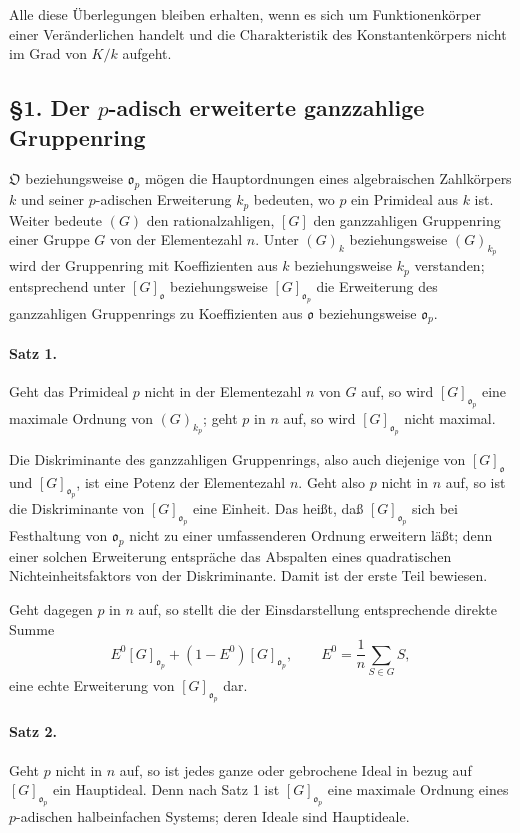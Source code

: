 \documentclass[11pt]{article}
\providecommand{\frako}{\mathfrak o}
\providecommand{\frakO}{\mathfrak O}
\begin{document}
Alle diese Überlegungen bleiben erhalten, wenn es sich um Funktionenkörper einer Veränderlichen handelt und die Charakteristik des Konstantenkörpers nicht im Grad von \(K/k\) aufgeht.

\subsection*{§1. Der \(p\)-adisch erweiterte ganzzahlige Gruppenring}

\(\frakO\) beziehungsweise \(\frako_p\) mögen die Hauptordnungen eines algebraischen Zahlkörpers \(k\) und seiner \(p\)-adischen Erweiterung \(k_p\) bedeuten, wo \(p\) ein Primideal aus \(k\) ist. Weiter bedeute \((G)\) den rationalzahligen, \([G]\) den ganzzahligen Gruppenring einer Gruppe \(G\) von der Elementezahl \(n\). Unter \((G)_k\) beziehungsweise \((G)_{k_p}\) wird der Gruppenring mit Koeffizienten aus \(k\) beziehungsweise \(k_p\) verstanden; entsprechend unter \([G]_{\frako}\) beziehungsweise \([G]_{\frako_p}\) die Erweiterung des ganzzahligen Gruppenrings zu Koeffizienten aus \(\frako\) beziehungsweise \(\frako_p\).

\paragraph{Satz 1.}
Geht das Primideal \(p\) nicht in der Elementezahl \(n\) von \(G\) auf, so wird \([G]_{\frako_p}\) eine maximale Ordnung von \((G)_{k_p}\); geht \(p\) in \(n\) auf, so wird \([G]_{\frako_p}\) nicht maximal.

Die Diskriminante des ganzzahligen Gruppenrings, also auch diejenige von \([G]_{\frako}\) und \([G]_{\frako_p}\), ist eine Potenz der Elementezahl \(n\). Geht also \(p\) nicht in \(n\) auf, so ist die Diskriminante von \([G]_{\frako_p}\) eine Einheit. Das heißt, daß \([G]_{\frako_p}\) sich bei Festhaltung von \(\frako_p\) nicht zu einer umfassenderen Ordnung erweitern läßt; denn einer solchen Erweiterung entspräche das Abspalten eines quadratischen Nichteinheitsfaktors von der Diskriminante. Damit ist der erste Teil bewiesen.

Geht dagegen \(p\) in \(n\) auf, so stellt die der Einsdarstellung entsprechende direkte Summe
\[
        E^0 [G]_{\frako_p}+(1-E^0)[G]_{\frako_p},
        \qquad
        E^0=\frac1n\sum_{S\in G}S,
\]
eine echte Erweiterung von \([G]_{\frako_p}\) dar.

\paragraph{Satz 2.}
Geht \(p\) nicht in \(n\) auf, so ist jedes ganze oder gebrochene Ideal in bezug auf \([G]_{\frako_p}\) ein Hauptideal. Denn nach Satz 1 ist \([G]_{\frako_p}\) eine maximale Ordnung eines \(p\)-adischen halbeinfachen Systems; deren Ideale sind Hauptideale.
\end{document}
